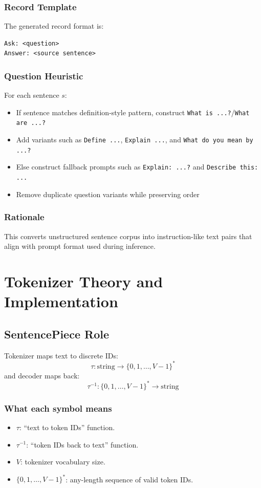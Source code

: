 \documentclass[a4paper,11pt]{article}
\begin{document}
\subsubsection{Record Template}
The generated record format is:
\begin{verbatim}
Ask: <question>
Answer: <source sentence>
\end{verbatim}

\subsubsection{Question Heuristic}
For each sentence $s$:
\begin{itemize}[leftmargin=1.5em]
    \item If sentence matches definition-style pattern, construct \texttt{What is ...?}/\texttt{What are ...?}
    \item Add variants such as \texttt{Define ...}, \texttt{Explain ...}, and \texttt{What do you mean by ...?}
    \item Else construct fallback prompts such as \texttt{Explain: ...?} and \texttt{Describe this: ...}
    \item Remove duplicate question variants while preserving order
\end{itemize}

\subsubsection{Rationale}
This converts unstructured sentence corpus into instruction-like text pairs that align with prompt format used during inference.

\section{Tokenizer Theory and Implementation}
\subsection{SentencePiece Role}
Tokenizer maps text to discrete IDs:
\[
\tau: \text{string} \rightarrow \{0,1,\ldots,V-1\}^*
\]
and decoder maps back:
\[
\tau^{-1}: \{0,1,\ldots,V-1\}^* \rightarrow \text{string}
\]

\subsubsection{What each symbol means}
\begin{itemize}[leftmargin=1.5em]
    \item $\tau$: ``text to token IDs'' function.
    \item $\tau^{-1}$: ``token IDs back to text'' function.
    \item $V$: tokenizer vocabulary size.
    \item $\{0,1,\ldots,V-1\}^*$: any-length sequence of valid token IDs.
\end{itemize}
\end{document}
